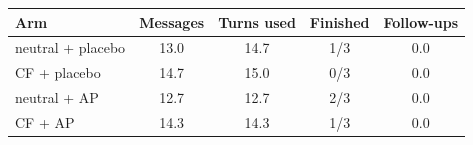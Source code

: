 \begin{tabular}{lcccc}
\toprule
Arm & Messages & Turns used & Finished & Follow-ups \\
\midrule
neutral + placebo & 13.0 & 14.7 & 1/3 & 0.0 \\
CF + placebo & 14.7 & 15.0 & 0/3 & 0.0 \\
neutral + AP & 12.7 & 12.7 & 2/3 & 0.0 \\
CF + AP & 14.3 & 14.3 & 1/3 & 0.0 \\
\bottomrule
\end{tabular}

